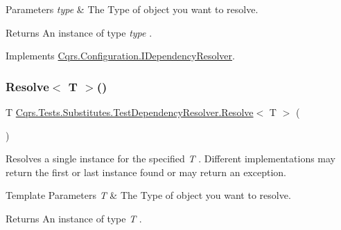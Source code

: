 \begin{DoxyParams}{Parameters}
{\em type} & The Type of object you want to resolve.\\
\hline
\end{DoxyParams}
\begin{DoxyReturn}{Returns}
An instance of type {\itshape type} .
\end{DoxyReturn}


Implements \hyperlink{interfaceCqrs_1_1Configuration_1_1IDependencyResolver_aa455096b7b94fc1d64904bc67830ec06_aa455096b7b94fc1d64904bc67830ec06}{Cqrs.\+Configuration.\+I\+Dependency\+Resolver}.

\mbox{\label{classCqrs_1_1Tests_1_1Substitutes_1_1TestDependencyResolver_a67090a882241fa6a881d49c91c95cad7_a67090a882241fa6a881d49c91c95cad7}} 
\subsubsection{\texorpdfstring{Resolve$<$ T $>$()}{Resolve< T >()}}
{\footnotesize\ttfamily T \hyperlink{classCqrs_1_1Tests_1_1Substitutes_1_1TestDependencyResolver_a05767824475ea6affbf6f70cf5b1fd06_a05767824475ea6affbf6f70cf5b1fd06}{Cqrs.\+Tests.\+Substitutes.\+Test\+Dependency\+Resolver.\+Resolve}$<$ T $>$ (\begin{DoxyParamCaption}{ }\end{DoxyParamCaption})}



Resolves a single instance for the specified {\itshape T} . Different implementations may return the first or last instance found or may return an exception. 


\begin{DoxyTemplParams}{Template Parameters}
{\em T} & The Type of object you want to resolve.\\
\hline
\end{DoxyTemplParams}
\begin{DoxyReturn}{Returns}
An instance of type {\itshape T} .
\end{DoxyReturn}


